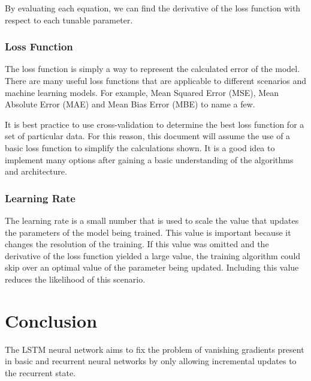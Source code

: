 \documentclass[12pt]{article}
\begin{document}
By evaluating each equation, we can find the derivative of the loss function
with respect to each tunable parameter.


\subsubsection{Loss Function}

The loss function is simply a way to represent the calculated error of the
model. There are many useful loss functions that are applicable to different
scenarios and machine learning models. For example, Mean Squared Error (MSE),
Mean Absolute Error (MAE) and Mean Bias Error (MBE) to name a few.

It is best practice to use cross-validation to determine the best loss function
for a set of particular data. For this reason, this document will assume the
use of a basic loss function to simplify the calculations shown. It is a good
idea to implement many options after gaining a basic understanding of the
algorithms and architecture.

\subsubsection{Learning Rate}

The learning rate is a small number that is used to scale the value that
updates the parameters of the model being trained. This value is important
because it changes the resolution of the training. If this value was omitted
and the derivative of the loss function yielded a large value, the training
algorithm could skip over an optimal value of the parameter being updated.
Including this value reduces the likelihood of this scenario.

\section{Conclusion}
The LSTM neural network aims to fix the problem of vanishing gradients present
in basic and recurrent neural networks by only allowing incremental updates to
the recurrent state.
\end{document}
